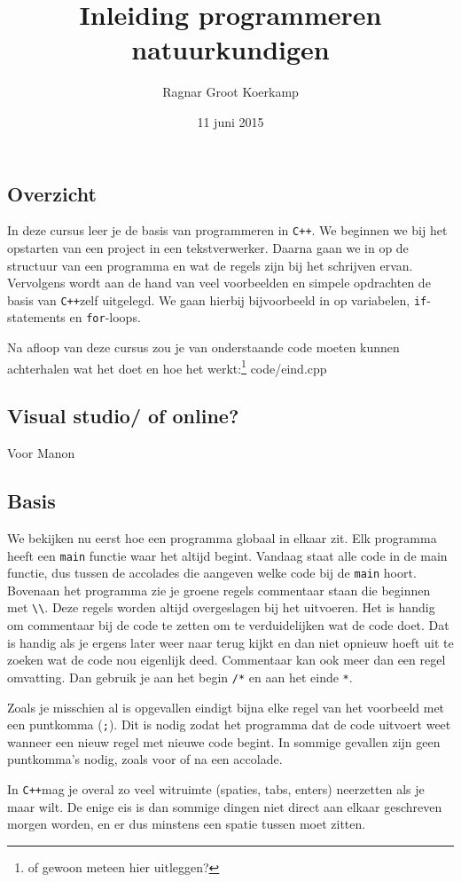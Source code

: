 \documentclass[12pt,a4paper]{article}
\title{Inleiding programmeren natuurkundigen}
\author{Ragnar Groot Koerkamp}
\date{11 juni 2015}
\newcommand{\code}{}
\newcommand{\icode}{\lstinline}
\newcommand{\mono}{\texttt}
\newcommand{\cpp}{\mono{C++}}
\begin{document}
 
\maketitle

\tableofcontents
\subsection{Overzicht}
In deze cursus leer je de basis van programmeren in \cpp. We beginnen we bij het opstarten van een project in een tekstverwerker. Daarna gaan we in op de structuur van een programma en wat de regels zijn bij het schrijven ervan. Vervolgens wordt aan de hand van veel voorbeelden en simpele opdrachten de basis van \cpp zelf uitgelegd. We gaan hierbij bijvoorbeeld in op variabelen, \icode{if}-statements en \icode{for}-loops.

Na afloop van deze cursus zou je van onderstaande code moeten kunnen achterhalen wat het doet en hoe het werkt:\footnote{of gewoon meteen hier uitleggen?}
\code{code/eind.cpp}
\subsection{Visual studio/ of online?}
Voor Manon
\subsection{Basis}
We bekijken nu eerst hoe een programma globaal in elkaar zit. Elk programma heeft een \icode{main} functie waar het altijd begint. Vandaag staat alle code in de main functie, dus tussen de accolades die aangeven welke code bij de \icode{main} hoort.
Bovenaan het programma zie je groene regels commentaar staan die beginnen met \icode{\\}. Deze regels worden altijd overgeslagen bij het uitvoeren. Het is handig om commentaar bij de code te zetten om te verduidelijken wat de code doet. Dat is handig als je ergens later weer naar terug kijkt en dan niet opnieuw hoeft uit te zoeken wat de code nou eigenlijk deed. Commentaar kan ook meer dan een regel omvatting. Dan gebruik je aan het begin \icode{/*} en aan het einde \icode{*}.

Zoals je misschien al is opgevallen eindigt bijna elke regel van het voorbeeld met een puntkomma (\icode{;}). Dit is nodig zodat het programma dat de code uitvoert weet wanneer een nieuw regel met nieuwe code begint. In sommige gevallen zijn geen puntkomma's nodig, zoals voor of na een accolade.

In \cpp mag je overal zo veel witruimte (spaties, tabs, enters) neerzetten als je maar wilt. De enige eis is dan sommige dingen niet direct aan elkaar geschreven morgen worden, en er dus minstens een spatie tussen moet zitten.
\end{document}
